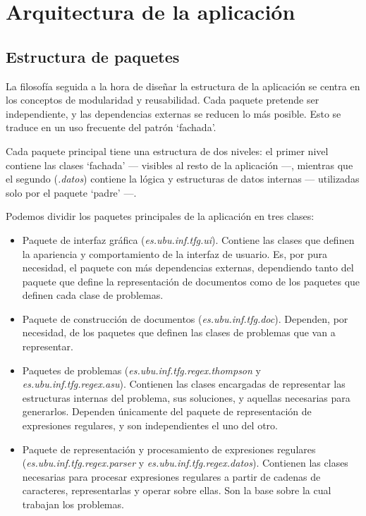 
\section{Arquitectura de la aplicación}
\subsection{Estructura de paquetes}
La filosofía seguida a la hora de diseñar la estructura de la aplicación se centra en los conceptos de modularidad y reusabilidad.
Cada paquete pretende ser independiente, y las dependencias externas se reducen lo más posible.
Esto se traduce en un uso frecuente del patrón `fachada'.

Cada paquete principal tiene una estructura de dos niveles: el primer nivel contiene las clases `fachada' --- visibles al resto de la aplicación ---, mientras que el segundo (\emph{.datos}) contiene la lógica y estructuras de datos internas --- utilizadas solo por el paquete `padre' ---.

Podemos dividir los paquetes principales de la aplicación en tres clases:
\begin{itemize}
	\item Paquete de interfaz gráfica (\emph{es.ubu.inf.tfg.ui}).
	Contiene las clases que definen la apariencia y comportamiento de la interfaz de usuario.
	Es, por pura necesidad, el paquete con más dependencias externas, dependiendo tanto del paquete que define la representación de documentos como de los paquetes que definen cada clase de problemas.
	\item Paquete de construcción de documentos (\emph{es.ubu.inf.tfg.doc}).
	Dependen, por necesidad, de los paquetes que definen las clases de problemas que van a representar.
	\item Paquetes de problemas (\emph{es.ubu.inf.tfg.regex.thompson} y \emph{es.ubu.inf.tfg.regex.asu}).
	Contienen las clases encargadas de representar las estructuras internas del problema, sus soluciones, y aquellas necesarias para generarlos.
	Dependen únicamente del paquete de representación de expresiones regulares, y son independientes el uno del otro.
	\item Paquete de representación y procesamiento de expresiones regulares (\emph{es.ubu.inf.tfg.regex.parser} y \emph{es.ubu.inf.tfg.regex.datos}).
	Contienen las clases necesarias para procesar expresiones regulares a partir de cadenas de caracteres, representarlas y operar sobre ellas.
	Son la base sobre la cual trabajan los problemas.
\end{itemize}

